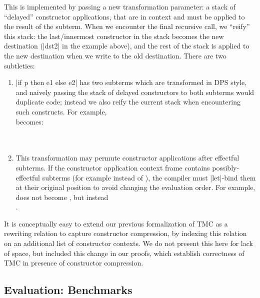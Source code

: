 This is implemented by passing a new transformation parameter: a stack of ``delayed'' constructor applications, that are in context and must be applied to the result of the subterm. When we encounter the final recursive call, we ``reify'' this stack: the last/innermost constructor in the stack becomes the new destination (\ocaml|dst2| in the example above), and the rest of the stack is applied to the new destination when we write to the old destination. There are two subtleties:
\begin{enumerate}
\item \ocaml|if p then e1 else e2| has two subterms which are transformed in DPS style, and naively passing the stack of delayed constructors to both subterms would duplicate code; instead we also reify the current stack when encountering such constructs. For example,\\
becomes:\\
\\
\\

\item This transformation may permute constructor applications after effectful subterms. If the constructor application context frame contains possibly-effectful subterms (for example  instead of ), the compiler must \ocaml|let|-bind them at their original position to avoid changing the evaluation order. For example,\\
 does not become ,
but instead \\ .
\end{enumerate}

It is conceptually easy to extend our previous formalization of TMC as a rewriting relation to capture constructor compression, by indexing this relation on an additional list of constructor contexts. We do not present this here for lack of space, but included this change in our \Coq proofs, which establish correctness of TMC in presence of constructor compression.

\subsection{Evaluation: Benchmarks}

